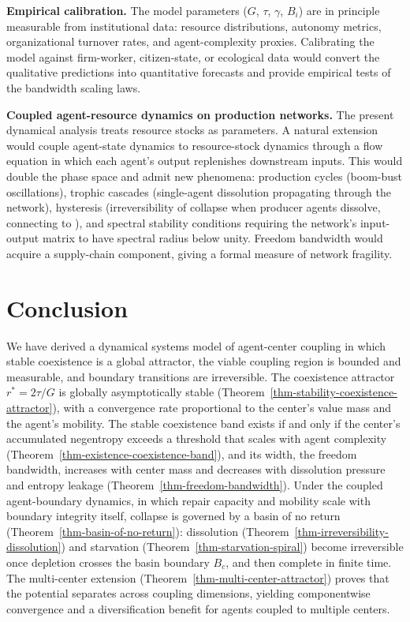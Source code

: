 \documentclass[11pt]{article}
\theoremstyle{plain}
\theoremstyle{definition}
\theoremstyle{remark}
\let\origsection\section
\renewcommand{\section}{\needspace{12\baselineskip}\origsection}
\begin{document}
\textbf{Empirical calibration.} The model parameters (\(G\), \(\tau\),
\(\gamma\), \(B_i\)) are in principle measurable from institutional
data: resource distributions, autonomy metrics, organizational turnover
rates, and agent-complexity proxies. Calibrating the model against
firm-worker, citizen-state, or ecological data would convert the
qualitative predictions into quantitative forecasts and provide
empirical tests of the bandwidth scaling laws.

\textbf{Coupled agent-resource dynamics on production networks.} The
present dynamical analysis treats resource stocks as parameters. A
natural extension would couple agent-state dynamics to resource-stock
dynamics through a flow equation in which each agent's output
replenishes downstream inputs. This would double the phase space and
admit new phenomena: production cycles (boom-bust oscillations), trophic
cascades (single-agent dissolution propagating through the network),
hysteresis (irreversibility of collapse when producer agents dissolve,
connecting to \citep{TC-III}), and spectral stability conditions
requiring the network's input-output matrix to have spectral radius
below unity. Freedom bandwidth would acquire a supply-chain component,
giving a formal measure of network fragility.

\section{Conclusion}\label{conclusion}

We have derived a dynamical systems model of agent-center coupling in
which stable coexistence is a global attractor, the viable coupling
region is bounded and measurable, and boundary transitions are
irreversible. The coexistence attractor \(r^* = 2\tau/G\) is globally
asymptotically stable
(Theorem~\ref{thm-stability-coexistence-attractor}), with a convergence
rate proportional to the center's value mass and the agent's mobility.
The stable coexistence band exists if and only if the center's
accumulated negentropy exceeds a threshold that scales with agent
complexity (Theorem~\ref{thm-existence-coexistence-band}), and its
width, the freedom bandwidth, increases with center mass and decreases
with dissolution pressure and entropy leakage
(Theorem~\ref{thm-freedom-bandwidth}). Under the coupled agent-boundary
dynamics, in which repair capacity and mobility scale with boundary
integrity itself, collapse is governed by a basin of no return
(Theorem~\ref{thm-basin-of-no-return}): dissolution
(Theorem~\ref{thm-irreversibility-dissolution}) and starvation
(Theorem~\ref{thm-starvation-spiral}) become irreversible once depletion
crosses the basin boundary \(B_c\), and then complete in finite time.
The multi-center extension (Theorem~\ref{thm-multi-center-attractor})
proves that the potential separates across coupling dimensions, yielding
componentwise convergence and a diversification benefit for agents
coupled to multiple centers.
\end{document}

